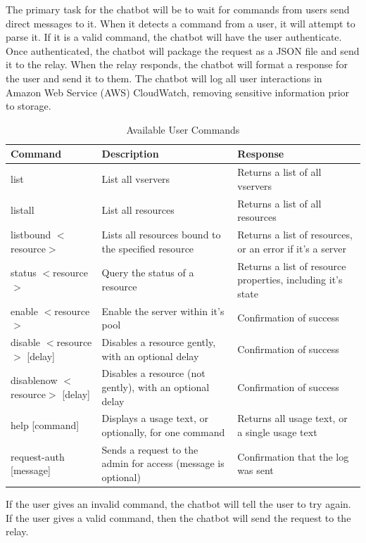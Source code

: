 The primary task for the chatbot will be to wait for commands from users send direct messages to it.
When it detects a command from a user, it will attempt to parse it.
If it is a valid command, the chatbot will have the user authenticate.
Once authenticated, the chatbot will package the request as a JSON file and send it to the relay.
When the relay responds, the chatbot will format a response for the user and send it to them.
The chatbot will log all user interactions in Amazon Web Service (AWS) CloudWatch, removing sensitive information prior to storage.

\begin{longtable}[h]{ | p{1.85in} | p{2.7in} | p{1.95in} |  }
     \caption{Available User Commands}
     \\\hline
     \textbf{Command} & \textbf{Description} & \textbf{Response} \\
     \hline
     list
     & List all vservers
     & Returns a list of all vservers\\
     \hline
     listall
     & List all resources
     & Returns a list of all resources\\
     \hline
     listbound $<$resource$>$
     & Lists all resources bound to the specified resource
     & Returns a list of resources, or an error if it's a server \\
     \hline
     status $<$resource$>$
     & Query the status of a resource
     & Returns a list of resource properties, including it's state \\
     \hline
     enable $<$resource$>$
     & Enable the server within it's pool
     & Confirmation of success \\
     \hline
     disable $<$resource$>$ [delay]
     & Disables a resource gently, with an optional delay
     & Confirmation of success \\
     \hline
     disablenow $<$resource$>$ [delay]
     & Disables a resource (not gently), with an optional delay
     & Confirmation of success \\
     \hline
     help [command]
     & Displays a usage text, or optionally, for one command
     & Returns all usage text, or a single usage text \\
     \hline
     request-auth [message]
     & Sends a request to the admin for access (message is optional)
     & Confirmation that the log was sent \\
     \hline
\end{longtable}

If the user gives an invalid command, the chatbot will tell the user to try again.
If the user gives a valid command, then the chatbot will send the request to the relay.

